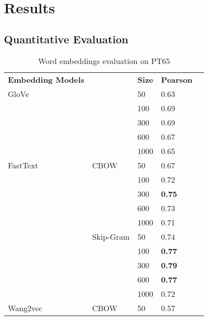 \section{Results}\label{chap:results}

\subsection{Quantitative Evaluation}\label{chap:results:quantitative}



\begin{table}[]
\caption{Word embeddings evaluation on PT65}
\label{tab:estacoes}
\centering%
\begin{minipage}{.5\textwidth}
\begin{tabular}{@{}lllll@{}}
\cmidrule(r){1-4}
\textbf{Embedding Models} &      & \textbf{Size} & \textbf{Pearson} \\ \cmidrule(r){1-4}
GloVe            &               & 50   & 0.63             \\
                 &               & 100  & 0.69             \\
                 &               & 300  & 0.69             \\
                 &               & 600  & 0.67             \\
                 &               & 1000 & 0.65             \\ \cmidrule(r){1-4}
FastText         & CBOW          & 50   & 0.67             \\
                 &               & 100  & 0.72             \\
                 &               & 300  & \textbf{0.75}    \\
                 &               & 600  & 0.73             \\
                 &               & 1000 & 0.71             \\ \cmidrule(lr){2-4}
                 & Skip-Gram     & 50   & 0.74             \\
                 &               & 100  & \textbf{0.77}    \\
                 &               & 300  & \textbf{0.79}    \\
                 &               & 600  & \textbf{0.77}    \\
                 &               & 1000 & 0.72             \\ \cmidrule(r){1-4}
Wang2vec         & CBOW          & 50   & 0.57             \\

\end{tabular}
\end{minipage}
\end{table}
